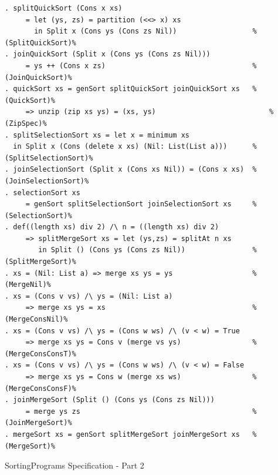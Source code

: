 \documentclass[12pt,twoside]{article}
\numberwithin{spec}{subsection}
\numberwithin{proof}{subsection}
\numberwithin{figure}{subsection}
\numberwithin{code}{subsection}
\begin{document}
\addtocounter{spec}{-1}
\begin{spec}
\begin{verbatim}
. splitQuickSort (Cons x xs) 
     = let (ys, zs) = partition (<<> x) xs 
       in Split x (Cons ys (Cons zs Nil))                  %(SplitQuickSort)%
. joinQuickSort (Split x (Cons ys (Cons zs Nil))) 
     = ys ++ (Cons x zs)                                   %(JoinQuickSort)%
. quickSort xs = genSort splitQuickSort joinQuickSort xs   %(QuickSort)%
     => unzip (zip xs ys) = (xs, ys)                           %(ZipSpec)%
. splitSelectionSort xs = let x = minimum xs
  in Split x (Cons (delete x xs) (Nil: List(List a)))      %(SplitSelectionSort)%
. joinSelectionSort (Split x (Cons xs Nil)) = (Cons x xs)  %(JoinSelectionSort)%
. selectionSort xs
     = genSort splitSelectionSort joinSelectionSort xs     %(SelectionSort)%
. def((length xs) div 2) /\ n = ((length xs) div 2) 
     => splitMergeSort xs = let (ys,zs) = splitAt n xs
        in Split () (Cons ys (Cons zs Nil))                %(SplitMergeSort)%
. xs = (Nil: List a) => merge xs ys = ys                   %(MergeNil)%
. xs = (Cons v vs) /\ ys = (Nil: List a) 
     => merge xs ys = xs                                   %(MergeConsNil)%
. xs = (Cons v vs) /\ ys = (Cons w ws) /\ (v < w) = True 
     => merge xs ys = Cons v (merge vs ys)                 %(MergeConsConsT)%
. xs = (Cons v vs) /\ ys = (Cons w ws) /\ (v < w) = False 
     => merge xs ys = Cons w (merge xs ws)                 %(MergeConsConsF)%
. joinMergeSort (Split () (Cons ys (Cons zs Nil))) 
     = merge ys zs                                         %(JoinMergeSort)%
. mergeSort xs = genSort splitMergeSort joinMergeSort xs   %(MergeSort)%
\end{verbatim}
\caption{SortingPrograms Specification - Part 2}
\end{spec}
\end{document}
